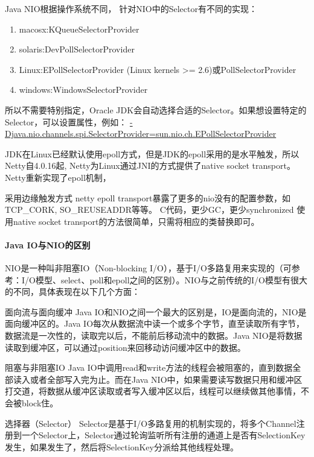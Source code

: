 \documentclass[../../../interview-questions.tex]{subfiles}
\begin{document}
Java NIO根据操作系统不同， 针对NIO中的Selector有不同的实现：

\begin{enumerate}
\item{macosx:KQueueSelectorProvider}
\item{solaris:DevPollSelectorProvider}
\item{Linux:EPollSelectorProvider (Linux kernels >= 2.6)或PollSelectorProvider}
\item{windows:WindowsSelectorProvider}
\end{enumerate}
所以不需要特别指定，Oracle JDK会自动选择合适的Selector。如果想设置特定的Selector，可以设置属性，例如：
\url{-Djava.nio.channels.spi.SelectorProvider=sun.nio.ch.EPollSelectorProvider}

JDK在Linux已经默认使用epoll方式，但是JDK的epoll采用的是水平触发，所以Netty自4.0.16起, Netty为Linux通过JNI的方式提供了native socket transport。Netty重新实现了epoll机制，

采用边缘触发方式
netty epoll transport暴露了更多的nio没有的配置参数，如 TCP\_CORK, SO\_REUSEADDR等等。
C代码，更少GC，更少synchronized
使用native socket transport的方法很简单，只需将相应的类替换即可。


\paragraph{Java IO与NIO的区别}

NIO是一种叫非阻塞IO（Non-blocking I/O），基于I/O多路复用来实现的（可参考：I/O模型、select、poll和epoll之间的区别）。NIO与之前传统的I/O模型有很大的不同，具体表现在以下几个方面：

面向流与面向缓冲
Java IO和NIO之间一个最大的区别是，IO是面向流的，NIO是面向缓冲区的。Java IO每次从数据流中读一个或多个字节，直至读取所有字节，数据流是一次性的，读取完以后，不能前后移动流中的数据。Java NIO是将数据读取到缓冲区，可以通过position来回移动访问缓冲区中的数据。

阻塞与非阻塞IO
Java IO中调用read和write方法的线程会被阻塞的，直到数据全部读入或者全部写入完为止。而在Java NIO中，如果需要读写数据只用和缓冲区打交道，将数据从缓冲区读取或者写入缓冲区以后，线程可以继续做其他事情，不会被block住。

选择器（Selector）
Selector是基于I/O多路复用的机制实现的，将多个Channel注册到一个Selector上，Selector通过轮询监听所有注册的通道上是否有SelectionKey发生，如果发生了，然后将SelectionKey分派给其他线程处理。
\end{document}
